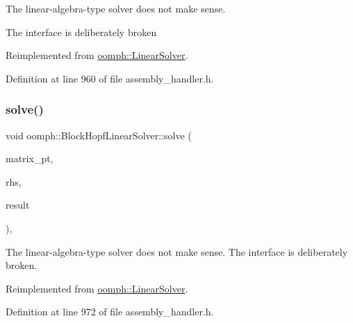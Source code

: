 The linear-\/algebra-\/type solver does not make sense. 

The interface is deliberately broken 

Reimplemented from \hyperlink{classoomph_1_1LinearSolver_a546c09822d18191df14caed864c04c09}{oomph\+::\+Linear\+Solver}.



Definition at line 960 of file assembly\+\_\+handler.\+h.

\mbox{\label{classoomph_1_1BlockHopfLinearSolver_a5074e6a65910bcbe881a3e1c71b1947f}} 
\subsubsection{\texorpdfstring{solve()}{solve()}\hspace{0.1cm}{\footnotesize\ttfamily [3/3]}}
{\footnotesize\ttfamily void oomph\+::\+Block\+Hopf\+Linear\+Solver\+::solve (\begin{DoxyParamCaption}\item[{\hyperlink{classoomph_1_1DoubleMatrixBase}{Double\+Matrix\+Base} $\ast$const \&}]{matrix\+\_\+pt,  }\item[{const \hyperlink{classoomph_1_1Vector}{Vector}$<$ double $>$ \&}]{rhs,  }\item[{\hyperlink{classoomph_1_1Vector}{Vector}$<$ double $>$ \&}]{result }\end{DoxyParamCaption})\hspace{0.3cm}{\ttfamily [inline]}, {\ttfamily [virtual]}}



The linear-\/algebra-\/type solver does not make sense. The interface is deliberately broken. 



Reimplemented from \hyperlink{classoomph_1_1LinearSolver_a1f7a2ee2cd18d3dafc20a61ca2f52dbb}{oomph\+::\+Linear\+Solver}.



Definition at line 972 of file assembly\+\_\+handler.\+h.

\mbox{\label{classoomph_1_1BlockHopfLinearSolver_a9a7cc6bda9ab1a8baf83d5d8e1fe5eea}} 
